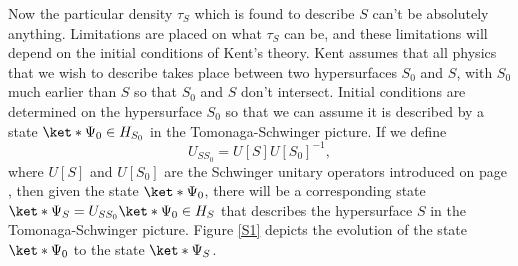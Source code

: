 \documentclass[12pt]{report}
\begin{document}
Now the particular density $\tau_S$ which is found to describe $S$ can't be absolutely anything. Limitations are placed on what $\tau_S$ can be, and these limitations will depend on the initial conditions of Kent's theory. Kent assumes that all physics that we wish to describe takes place between two hypersurfaces $S_0$ %
%
 and $S$, with $S_0$ much earlier than $S$ so that $S_0$ and $S$ don't intersect. Initial conditions are determined on the hypersurface $S_0$ so that we can assume it is described by a state $\ket*{\Psi_0}\in H_{S_0}$ in the Tomonaga-Schwinger picture. %
 If we  define 
\begin{equation}\label{SchwingerUnitaryOP}
U_{SS_0}=U[S]U[S_0]^{-1},
\end{equation} 
where $U[S]$ and $U[S_0]$ are the Schwinger unitary operators introduced on
 page \pageref{SchwingerOperator}, then
 given the state $\ket*{\Psi_0}$, there will be a corresponding state $\ket*{\Psi_S}=U_{SS_0}\ket*{\Psi_0}\in H_S$  %
  that describes the hypersurface $S$ in the Tomonaga-Schwinger picture. Figure \ref{S1} depicts the evolution of the state $\ket*{\Psi_0}$ to the state $\ket*{\Psi_S}$.
\end{document}
